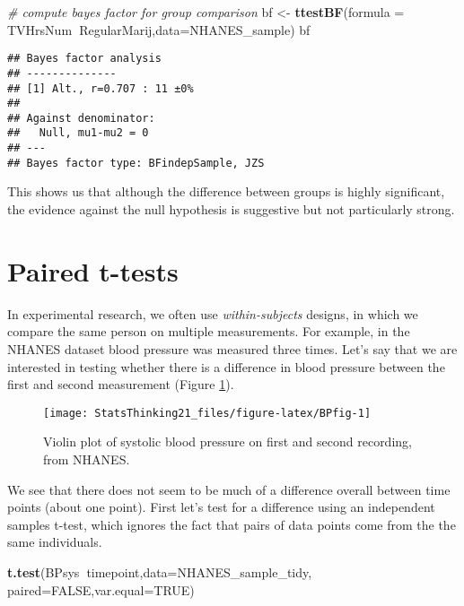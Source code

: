 \documentclass[]{book}
\newenvironment{Shaded}{\begin{snugshade}}{\end{snugshade}}
\newcommand{\KeywordTok}[1]{\textcolor[rgb]{0.13,0.29,0.53}{\textbf{#1}}}
\newcommand{\DataTypeTok}[1]{\textcolor[rgb]{0.13,0.29,0.53}{#1}}
\newcommand{\StringTok}[1]{\textcolor[rgb]{0.31,0.60,0.02}{#1}}
\newcommand{\CommentTok}[1]{\textcolor[rgb]{0.56,0.35,0.01}{\textit{#1}}}
\newcommand{\OtherTok}[1]{\textcolor[rgb]{0.56,0.35,0.01}{#1}}
\newcommand{\OperatorTok}[1]{\textcolor[rgb]{0.81,0.36,0.00}{\textbf{#1}}}
\newcommand{\NormalTok}[1]{#1}
\theoremstyle{definition}
\theoremstyle{definition}
\theoremstyle{definition}
\theoremstyle{remark}
\begin{document}
\begin{Shaded}
\begin{Highlighting}[]
\CommentTok{# compute bayes factor for group comparison}
\NormalTok{bf <-}\StringTok{ }\KeywordTok{ttestBF}\NormalTok{(}\DataTypeTok{formula =} 
\NormalTok{    TVHrsNum}\OperatorTok{~}\NormalTok{RegularMarij,}\DataTypeTok{data=}\NormalTok{NHANES_sample)}
\NormalTok{bf}
\end{Highlighting}
\end{Shaded}

\begin{verbatim}
## Bayes factor analysis
## --------------
## [1] Alt., r=0.707 : 11 ±0%
## 
## Against denominator:
##   Null, mu1-mu2 = 0 
## ---
## Bayes factor type: BFindepSample, JZS
\end{verbatim}

This shows us that although the difference between groups is highly
significant, the evidence against the null hypothesis is suggestive but
not particularly strong.

\section{Paired t-tests}\label{paired-t-tests}

In experimental research, we often use \emph{within-subjects} designs,
in which we compare the same person on multiple measurements. For
example, in the NHANES dataset blood pressure was measured three times.
Let's say that we are interested in testing whether there is a
difference in blood pressure between the first and second measurement
(Figure \ref{fig:BPfig}).

\begin{figure}
\texttt{[image: StatsThinking21\_files/figure-latex/BPfig-1]} \caption{Violin plot of systolic blood pressure on first and second recording, from NHANES.}\label{fig:BPfig}
\end{figure}

We see that there does not seem to be much of a difference overall
between time points (about one point). First let's test for a difference
using an independent samples t-test, which ignores the fact that pairs
of data points come from the the same individuals.

\begin{Shaded}
\begin{Highlighting}[]
\KeywordTok{t.test}\NormalTok{(BPsys}\OperatorTok{~}\NormalTok{timepoint,}\DataTypeTok{data=}\NormalTok{NHANES_sample_tidy,}
       \DataTypeTok{paired=}\OtherTok{FALSE}\NormalTok{,}\DataTypeTok{var.equal=}\OtherTok{TRUE}\NormalTok{)}
\end{Highlighting}
\end{Shaded}
\end{document}
